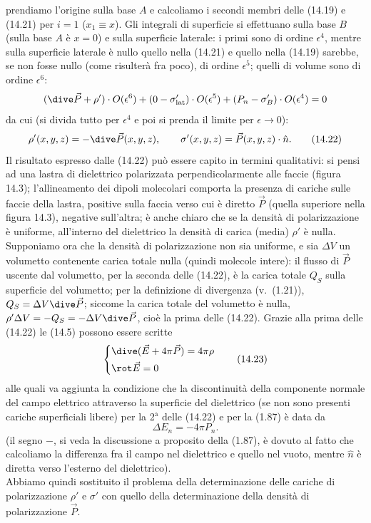 prendiamo l'origine sulla base $A$ e calcoliamo i secondi membri delle (14.19) e
(14.21) per $i=1$ ($x_1\equiv x$). Gli integrali di superficie si effettuano
sulla base $B$ (sulla base $A$ \`e $x=0$) e sulla superficie laterale: i primi
sono di ordine $\epsilon^4$, mentre sulla superficie laterale \`e nullo quello
nella (14.21) e quello nella (14.19) sarebbe, se non fosse nullo (come
risulter\`a fra poco), di ordine $\epsilon^5$; quelli di volume sono di ordine
$\epsilon^6$:
\[
  (\dive\vec P+\rho')\cdot O(\epsilon^6)
  +(0-\sigma'_\mathrm{lat})\cdot O(\epsilon^5)
  +(P_n-\sigma'_B)\cdot O(\epsilon^4)=0
\]
da cui (si divida tutto per $\epsilon^4$ e poi si prenda il limite per
$\epsilon\to0$):
\begin{equation}
  \rho'(x,y,z)=-\dive\vec P(x,y,z),
  \qquad\sigma'(x,y,z)=\vec P(x,y,z)\cdot\hat n.
  \tag{14.22}
\end{equation}
Il risultato espresso dalle (14.22) pu\`o essere capito in termini qualitativi:
si pensi ad una lastra di dielettrico polarizzata perpendicolarmente alle faccie
(figura 14.3); l'allineamento dei dipoli molecolari comporta la presenza di
cariche sulle faccie della lastra, positive sulla faccia verso cui \`e diretto
$\vec P$ (quella superiore nella figura 14.3), negative sull'altra; \`e anche
chiaro che se la densit\`a di polarizzazione \`e uniforme, all'interno del
dielettrico la densit\`a di carica (media) $\rho'$ \`e nulla. Supponiamo ora che
la densit\`a di polarizzazione non sia uniforme, e sia $\Delta V$ un volumetto
contenente carica totale nulla (quindi molecole intere): il flusso di $\vec P$
uscente dal volumetto, per la seconda delle (14.22), \`e la carica totale $Q_S$
sulla superficie del volumetto; per la definizione di divergenza
\big(v.\ (1.21)\big), $Q_S=\Delta V\dive\vec P$; siccome la carica totale del
volumetto \`e nulla, \ $\rho'\Delta V=-Q_S=-\Delta V\dive\vec P$, cio\`e la
prima delle (14.22).
Grazie alla prima delle (14.22) le (14.5) possono essere scritte
\begin{equation}
  \left\{\begin{aligned}
    &\dive(\vec E+4\pi\vec P)=4\pi\rho\\
    &\rot\vec E=0
  \end{aligned}\right.
  \tag{14.23}
\end{equation}
alle quali va aggiunta la condizione che la discontinuit\`a della componente
normale del campo elettrico attraverso la superficie del dielettrico (se non
sono presenti cariche superficiali libere) per la 2$^\mathrm{a}$ delle (14.22) e
per la (1.87) \`e data da
\begin{equation}
  \Delta E_n=-4\pi P_n.
  \tag{14.24}
\end{equation}
(il segno $-$, si veda la discussione a proposito della (1.87), \`e dovuto al
fatto che calcoliamo la differenza fra il campo nel dielettrico e quello nel
vuoto, mentre $\hat n$ \`e diretta verso l'esterno del dielettrico).\\
Abbiamo quindi sostituito il problema della determinazione delle cariche di
polarizzazione $\rho'$ e $\sigma'$ con quello della determinazione della
densit\`a di polarizzazione $\vec P$.

